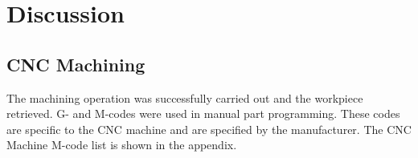 \section{Discussion}
\subsection{CNC Machining}
The machining operation was successfully carried out and the workpiece retrieved. G- and M-codes were used in manual part programming. These codes are specific to the CNC machine and are specified by the manufacturer. The CNC Machine M-code list is shown in the appendix.\\